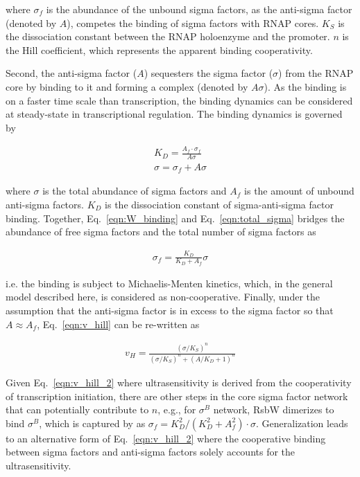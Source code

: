 where $\sigma_f$ is the abundance of the unbound sigma factors, as
the anti-sigma factor (denoted by $A$), competes the binding of 
sigma factors with RNAP cores.
$K_S$ is the dissociation constant between the RNAP holoenzyme and the promoter.
$n$ is the Hill coefficient, which represents the apparent binding cooperativity.

Second, the anti-sigma factor ($A$) sequesters the sigma factor ($\sigma$)
from the RNAP core by binding to it and forming a complex (denoted by $A\sigma$).
As the binding is on a faster time scale than transcription,
the binding dynamics can be considered at steady-state in
transcriptional regulation.
The binding dynamics is governed by 

\begin{gather}
    \label{eqn:W_binding}
    K_D = \frac{A_f\cdot \sigma_f}{A\sigma}\\
    \label{eqn:total_sigma}
    \sigma = \sigma_f + A\sigma
\end{gather}

where $\sigma$ is the total abundance of sigma factors
and $A_f$ is the amount of unbound anti-sigma factors.
$K_D$ is the dissociation constant of sigma-anti-sigma factor binding.
Together, Eq.~\ref{eqn:W_binding} and Eq.~\ref{eqn:total_sigma}
bridges the abundance of free sigma factors and 
the total number of sigma factors as

\begin{align}
    \label{eqn:sigma_f}
    \sigma_f = \frac{K_D}{K_D + A_f}\sigma
\end{align}

i.e. the binding is subject to Michaelis-Menten kinetics,
which, in the general model described here, is considered
as non-cooperative.
Finally, under the assumption that the anti-sigma factor is in excess
to the sigma factor so that $A \approx A_f$,
Eq.~\ref{eqn:v_hill} can be re-written as

\begin{align}
    \label{eqn:v_hill_2}
    v_H = \frac{(\sigma/K_S)^n}{(\sigma/K_S)^n + (A/K_D + 1)^n}
\end{align}

Given Eq.~\ref{eqn:v_hill_2} where ultrasensitivity is derived from
the cooperativity of transcription initiation,
there are other steps in the core sigma factor network that can
potentially contribute to $n$,
e.g., for $\sigma^B$ network, RsbW dimerizes to bind $\sigma^B$, which
is captured by as $\sigma_f = K_D^2/(K_D^2 + A_f^2)\cdot\sigma$.
Generalization leads to an alternative form of Eq.~\ref{eqn:v_hill_2}
where the cooperative binding between sigma factors and anti-sigma factors
solely accounts for the ultrasensitivity.

